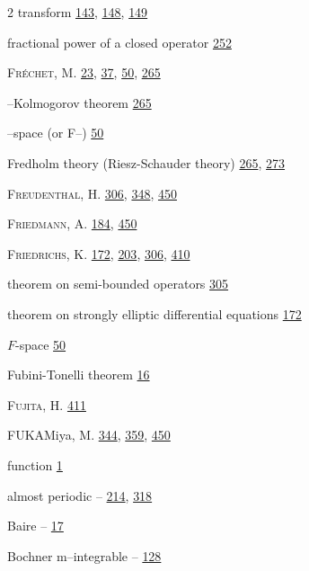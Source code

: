 \begin{multicols}{2}
\hspace*{1.1em}transform \hyperlink{page.143}{143}, \hyperlink{page.148}{148}, \hyperlink{page.149}{149}\par
\noindent fractional power of a closed operator \hyperlink{page.252}{252}\par
\noindent \textsc{Fréchet}, M. \hyperlink{page.23}{23}, \hyperlink{page.37}{37}, \hyperlink{page.50}{50}, \hyperlink{page.265}{265}\par
\hspace*{1.1em}--Kolmogorov theorem \hyperlink{page.265}{265}\par
\hspace*{1.1em}--space (or F--) \hyperlink{page.50}{50}\par
\noindent Fredholm theory (Riesz-Schauder theory) \hyperlink{page.265}{265}, \hyperlink{page.273}{273}\par
\noindent \textsc{Freudenthal}, H. \hyperlink{page.306}{306}, \hyperlink{page.348}{348}, \hyperlink{page.450}{450}\par
\noindent \textsc{Friedmann}, A. \hyperlink{page.184}{184}, \hyperlink{page.450}{450}\par
\noindent \textsc{Friedrichs}, K. \hyperlink{page.172}{172}, \hyperlink{page.203}{203}, \hyperlink{page.306}{306}, \hyperlink{page.410}{410}\par
\hspace*{1.1em}theorem on semi-bounded operators \hyperlink{page.305}{305}\par
\hspace*{1.1em}theorem on strongly elliptic differential equations \hyperlink{page.172}{172}\par
\noindent $F$-space \hyperlink{page.50}{50}\par
\noindent Fubini-Tonelli theorem \hyperlink{page.16}{16}\par
\noindent \textsc{Fujita}, H. \hyperlink{page.411}{411}\par
\noindent FUKAMiya, M. \hyperlink{page.344}{344}, \hyperlink{page.359}{359}, \hyperlink{page.450}{450}\par
\noindent function \hyperlink{page.1}{1}\par
\hspace*{1.1em}almost periodic -- \hyperlink{page.214}{214}, \hyperlink{page.318}{318}\par
\hspace*{1.1em}Baire -- \hyperlink{page.17}{17}\par
\hspace*{1.1em}Bochner m--integrable -- \hyperlink{page.128}{128}\par

\end{multicols}
